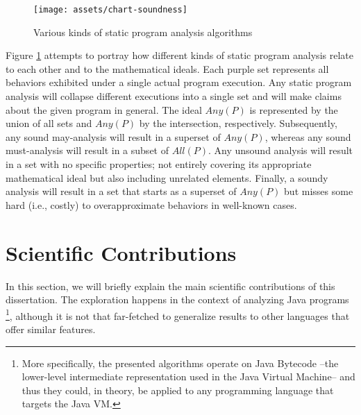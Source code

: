 \begin{figure}[htb]
\centering
\texttt{[image: assets/chart-soundness]}
\caption{Various kinds of static program analysis algorithms}
\label{fig:soundness}
\end{figure}

Figure \ref{fig:soundness} attempts to portray how different kinds of static program analysis relate to each other and to the mathematical ideals. Each purple set represents all behaviors exhibited under a single actual program execution. Any static program analysis will collapse different executions into a single set and will make claims about the given program in general. The ideal $Any(P)$ is represented by the union of all sets and $Any(P)$ by the intersection, respectively. Subsequently, any sound may-analysis will result in a superset of $Any(P)$, whereas any sound must-analysis will result in a subset of $All(P)$. Any unsound analysis will result in a set with no specific properties; not entirely covering its appropriate mathematical ideal but also including unrelated elements. Finally, a soundy analysis will result in a set that starts as a superset of $Any(P)$ but misses some hard (i.e., costly) to overapproximate behaviors in well-known cases.



\section{Scientific Contributions}

In this section, we will briefly explain the main scientific contributions of this dissertation. The exploration happens in the context of analyzing Java programs \footnote{More specifically, the presented algorithms operate on Java Bytecode --the lower-level intermediate representation used in the Java Virtual Machine-- and thus they could, in theory, be applied to any programming language that targets the Java VM.}, although it is not that far-fetched to generalize results to other languages that offer similar features.  

